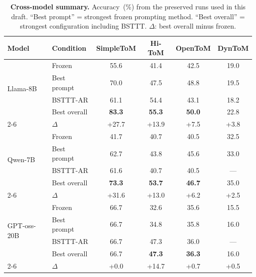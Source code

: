 \begin{table}[t]
    \caption{\textbf{Cross-model summary.} Accuracy~(\%) from the preserved runs used in this draft.
    ``Best prompt'' = strongest frozen prompting method.
    ``Best overall'' = strongest configuration including BSTTT.
    $\Delta$: best overall minus frozen.}
    \label{tab:summary}
    \centering
    \small
    \begin{tabular}{@{}llcccc@{}}
        \toprule
        \textbf{Model} & \textbf{Condition} & \textbf{SimpleToM} & \textbf{Hi-ToM} & \textbf{OpenToM} & \textbf{DynToM} \\
        \midrule
        \multirow{4}{*}{Llama-8B}
            & Frozen         & 55.6 & 41.4 & 42.5 & 19.0 \\
            & Best prompt    & 70.0 & 47.5 & 48.8 & 19.5 \\
            & BSTTT-AR       & 61.1 & 54.4 & 43.1 & 18.2 \\
            & Best overall   & \textbf{83.3} & \textbf{55.3} & \textbf{50.0} & 22.8 \\
        \cmidrule(l){2-6}
            & $\Delta$       & +27.7 & +13.9 & +7.5 & +3.8 \\
        \midrule
        \multirow{4}{*}{Qwen-7B}
            & Frozen         & 41.7 & 40.7 & 40.5 & 32.5 \\
            & Best prompt    & 62.7 & 43.8 & 45.6 & 33.0 \\
            & BSTTT-AR       & 61.6 & 40.7 & 40.5 & --- \\
            & Best overall   & \textbf{73.3} & \textbf{53.7} & \textbf{46.7} & 35.0 \\
        \cmidrule(l){2-6}
            & $\Delta$       & +31.6 & +13.0 & +6.2 & +2.5 \\
        \midrule
        \multirow{4}{*}{GPT-oss-20B}
            & Frozen         & 66.7 & 32.6 & 35.6 & 15.5 \\
            & Best prompt    & 66.7 & 34.8 & 35.8 & 16.0 \\
            & BSTTT-AR       & 66.7 & 47.3 & 36.0 & --- \\
            & Best overall   & 66.7 & \textbf{47.3} & \textbf{36.3} & 16.0 \\
        \cmidrule(l){2-6}
            & $\Delta$       & +0.0 & +14.7 & +0.7 & +0.5 \\
        \bottomrule
    \end{tabular}
\end{table}


